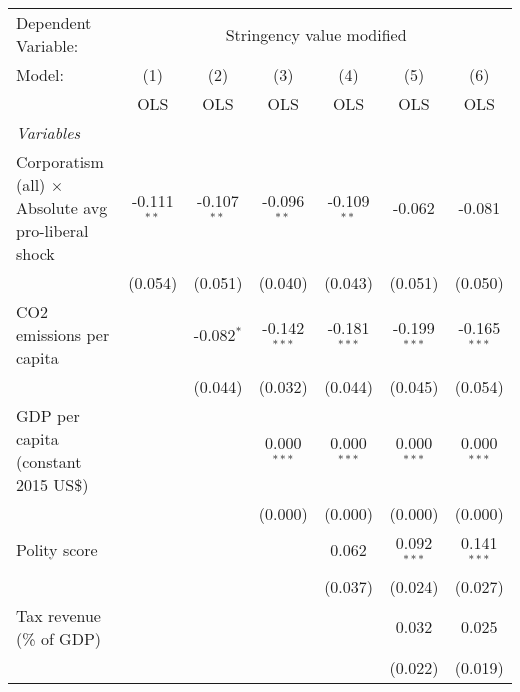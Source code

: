 
\begingroup
\centering
\begin{tabular}{lcccccc}
   \toprule
   Dependent Variable: & \multicolumn{6}{c}{Stringency value modified}\\
   Model:                                                     & (1)           & (2)           & (3)            & (4)            & (5)            & (6)\\  
                                                              &  OLS          & OLS           & OLS            & OLS            & OLS            & OLS\\  
   \midrule
   \emph{Variables}\\
   Corporatism (all) $\times$ Absolute avg pro-liberal shock  & -0.111$^{**}$ & -0.107$^{**}$ & -0.096$^{**}$  & -0.109$^{**}$  & -0.062         & -0.081\\   
                                                              & (0.054)       & (0.051)       & (0.040)        & (0.043)        & (0.051)        & (0.050)\\   
   CO2 emissions per capita                                   &               & -0.082$^{*}$  & -0.142$^{***}$ & -0.181$^{***}$ & -0.199$^{***}$ & -0.165$^{***}$\\   
                                                              &               & (0.044)       & (0.032)        & (0.044)        & (0.045)        & (0.054)\\   
   GDP per capita (constant 2015 US\$)                        &               &               & 0.000$^{***}$  & 0.000$^{***}$  & 0.000$^{***}$  & 0.000$^{***}$\\   
                                                              &               &               & (0.000)        & (0.000)        & (0.000)        & (0.000)\\   
   Polity score                                               &               &               &                & 0.062          & 0.092$^{***}$  & 0.141$^{***}$\\   
                                                              &               &               &                & (0.037)        & (0.024)        & (0.027)\\   
   Tax revenue (\% of GDP)                                    &               &               &                &                & 0.032          & 0.025\\   
                                                              &               &               &                &                & (0.022)        & (0.019)\\   

\end{tabular}
